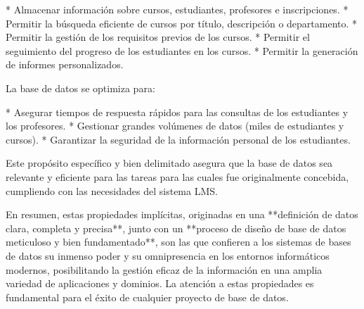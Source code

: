 *   Almacenar información sobre cursos, estudiantes, profesores e inscripciones.
*   Permitir la búsqueda eficiente de cursos por título, descripción o departamento.
*   Permitir la gestión de los requisitos previos de los cursos.
*   Permitir el seguimiento del progreso de los estudiantes en los cursos.
*   Permitir la generación de informes personalizados.

La base de datos se optimiza para:

*   Asegurar tiempos de respuesta rápidos para las consultas de los estudiantes y los profesores.
*   Gestionar grandes volúmenes de datos (miles de estudiantes y cursos).
*   Garantizar la seguridad de la información personal de los estudiantes.

Este propósito específico y bien delimitado asegura que la base de datos sea relevante y eficiente para las tareas para las cuales fue originalmente concebida, cumpliendo con las necesidades del sistema LMS.

En resumen, estas propiedades implícitas, originadas en una **definición de datos clara, completa y precisa**, junto con un **proceso de diseño de base de datos meticuloso y bien fundamentado**, son las que confieren a los sistemas de bases de datos su inmenso poder y su omnipresencia en los entornos informáticos modernos, posibilitando la gestión eficaz de la información en una amplia variedad de aplicaciones y dominios. La atención a estas propiedades es fundamental para el éxito de cualquier proyecto de base de datos.